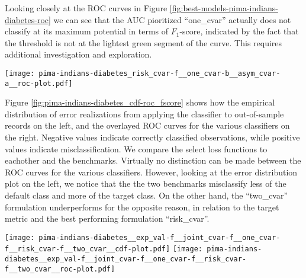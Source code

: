 \documentclass[10pt,letterpaper]{article}
\newcommand{\1}{1{\hskip -2.55 pt}\hbox{I}}
\begin{document}
Looking closely at the ROC curves in Figure \ref{fig:best-models-pima-indians-diabetes-roc} we can see that the AUC pioritized ``one\_cvar'' actually does not classify at its maximum potential in terms of $F_1$-score, indicated by the fact that the threshold is not at the lightest green segment of the curve.
This requires additional investigation and exploration.

\begin{figure*}[h!]
\begin{center}
\texttt{[image: pima-indians-diabetes\_risk\_cvar-f\_\_one\_cvar-b\_\_asym\_cvar-a\_\_roc-plot.pdf]}
\caption{ROC plots for the best performing model formulations on the ``pima-indians-diabetes'' data: ``risk\_cvar'' with the best $F_1$-score, ``one\_cvar'' featuring both parameter sets, and finally the ``asym\_risk'' formulation featuring the best AUC value}
\label{fig:best-models-pima-indians-diabetes-roc}
\end{center}
\end{figure*}


Figure \ref{fig:pima-indians-diabetes_cdf-roc_fscore} shows how the empirical distribution of error realizations from applying the classifier to out-of-sample records on the left, and the overlayed ROC curves for the various classifiers on the right. 
Negative values indicate correctly classified observations, while positive values indicate misclassification.
We compare the select loss functions to eachother and the benchmarks.
Virtually no distinction can be made between the ROC curves for the various classifiers.
However, looking at the error distribution plot on the left, we notice that the the two benchmarks misclassify less of the default class and more of the target class.
On the other hand, the ``two\_cvar'' formulation underperforms for the opposite reason, in relation to the target metric and the best performing formulation ``risk\_cvar''.

\begin{figure*}[!h]
\centering
\texttt{[image: pima-indians-diabetes\_\_exp\_val-f\_\_joint\_cvar-f\_\_one\_cvar-f\_\_risk\_cvar-f\_\_two\_cvar\_\_cdf-plot.pdf]}
\texttt{[image: pima-indians-diabetes\_\_exp\_val-f\_\_joint\_cvar-f\_\_one\_cvar-f\_\_risk\_cvar-f\_\_two\_cvar\_\_roc-plot.pdf]}
\caption{Empirical distribution of error realizations comparing risk-averse loss function formulations to benchmarks [$F_1$-score] on the ``pima-indians-diabetes'' dataset (left) and the corresponding ROC curves (right)}
\label{fig:pima-indians-diabetes_cdf-roc_fscore}
\end{figure*}
\end{document}
